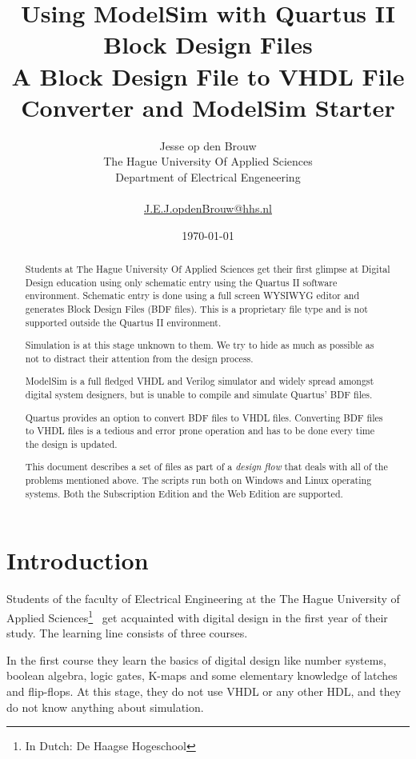 \documentclass[11pt,a4paper,final,oneside,titlepage,fleqn]{article}
\title{Using ModelSim with Quartus II Block Design Files \\ \medskip\large A Block Design File to VHDL File Converter and ModelSim Starter}
\author{Jesse op den Brouw \\
	The Hague University Of Applied Sciences \\
    Department of Electrical Engeneering \\
	\medskip  \\
	\href{mailto:J.E.J.opdenBrouw@hhs.nl}{J.E.J.opdenBrouw@hhs.nl} \\
	\bigskip
	}
\date{\today}
\begin{document}
\maketitle

\begin{abstract}
Students at The Hague University Of Applied Sciences get their first glimpse
at Digital Design education using only schematic entry using the Quartus II
software environment. Schematic entry is done using a full screen WYSIWYG
editor and generates Block Design Files (BDF files). This is a proprietary
file type and is not supported outside the Quartus II environment.

Simulation is at this stage unknown to them. We try to hide as much as
possible as not to distract their attention from the design process.

ModelSim is a full fledged VHDL and Verilog simulator and widely spread
amongst digital system designers, but is unable to compile and simulate
Quartus' BDF files.

Quartus provides an option to convert BDF files to VHDL files. Converting BDF
files to VHDL files is a tedious and error prone operation and has to be done
every time the design is updated.

This document describes a set of files as part of a \textit{design flow} that
deals with all of the problems mentioned above. The scripts run both on
Windows and Linux operating systems. Both the Subscription Edition and the Web
Edition are supported.
\end{abstract}

\tableofcontents
\newpage
\lstlistoflistings
\listoffigures
\newpage

\section{Introduction}
\label{sec:introduction}
Students of the faculty of Electrical Engineering at the The Hague University
of Applied Sciences\footnote{In Dutch: De Haagse Hogeschool}~\cite{web/hhs} get
acquainted with digital design in the first year of their study. The learning
line consists of three courses.

In the first course they learn the basics of digital design like number systems,
boolean algebra, logic gates, K-maps and some elementary knowledge of latches
and flip-flops. At this stage, they do not use VHDL or any other HDL, and they
do not know anything about simulation.
\end{document}
